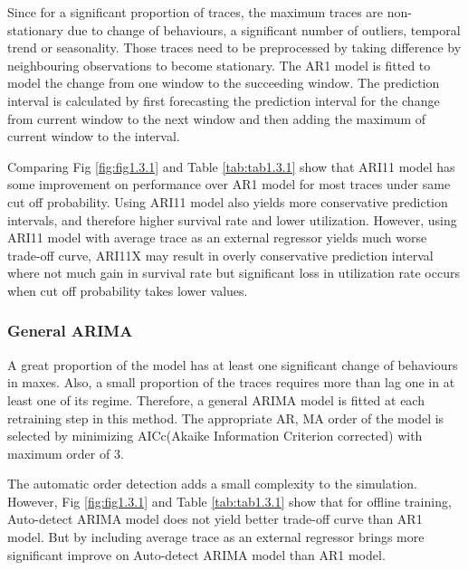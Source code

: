 \documentclass{article}
\begin{document}
\begin{flushleft}
Since for a significant proportion of traces, the maximum traces are
non-stationary due to change of behaviours, a significant number of outliers,
temporal trend or seasonality. Those traces need to be preprocessed by taking
difference by neighbouring observations to become stationary. The AR1 model is
fitted to model the change from one window to the succeeding window. The
prediction interval is calculated by first forecasting the prediction interval
for the change from current window to the next window and then adding the
maximum of current window to the interval.

Comparing Fig \ref{fig:fig1.3.1} and Table \ref{tab:tab1.3.1} show that ARI11
model has some improvement on performance over AR1 model for most traces under
same cut off probability. Using ARI11 model also yields more conservative
prediction intervals, and therefore higher survival rate and lower utilization.
However, using ARI11 model with average trace as an external regressor yields
much worse trade-off curve, ARI11X may result in overly conservative prediction
interval where not much gain in survival rate but significant loss in
utilization rate occurs when cut off probability takes lower values.
\end{flushleft}

\subsubsection{General ARIMA}

\begin{flushleft}
A great proportion of the model has at least one significant change of
behaviours in maxes. Also, a small proportion of the traces requires more than
lag one in at least one of its regime. Therefore, a general ARIMA model is
fitted at each retraining step in this method. The appropriate AR, MA order of
the model is selected by minimizing AICc(Akaike Information Criterion corrected)
with maximum order of 3. 

The automatic order detection adds a small complexity to the simulation.
However, Fig \ref{fig:fig1.3.1} and Table \ref{tab:tab1.3.1} show that for
offline training, Auto-detect ARIMA model does not yield better trade-off curve
than AR1 model. But by including average trace as an external regressor brings
more significant improve on Auto-detect ARIMA model than AR1 model.
\end{flushleft}
\end{document}
